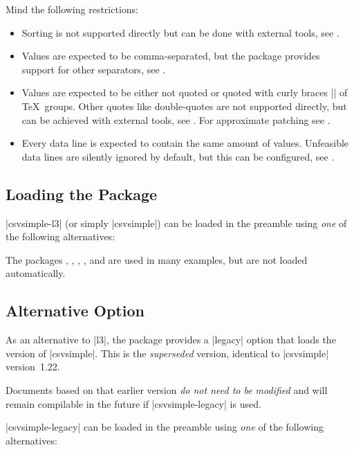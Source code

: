 \documentclass[a4paper,11pt]{ltxdoc}
\begin{document}
Mind the following restrictions:
\begin{itemize}
\item Sorting is not supported directly but can be done
  with external tools, see .
\item Values are expected to be comma-separated, but the package
  provides support for other separators, see .
\item Values are expected to be either not quoted or quoted with
  curly braces |{}| of \TeX\ groups. Other quotes like double-quotes
  are not supported directly, but can be achieved
  with external tools, see .
  For approximate patching see .
\item Every data line is expected to contain the same amount of values.
  Unfeasible data lines are silently ignored by default, but this can
  be configured, see .
\end{itemize}


\subsection{Loading the Package}
|csvsimple-l3| (or simply |csvsimple|) can be loaded in the preamble using
\emph{one} of the following alternatives:
\begin{dispListing}
\usepackage{csvsimple}
\usepackage[l3]{csvsimple}
\usepackage{csvsimple-l3}
\end{dispListing}

The packages , , ,
, and  are used in many examples, but are not
loaded automatically.

\subsection{Alternative Option}
As an alternative to |l3|, the package provides a |legacy| option that loads the
\LaTeXe{} version of |csvsimple|. This is the \emph{superseded} version,
identical to |csvsimple| version~1.22.

Documents based on that earlier version \emph{do not need to be modified} and
will remain compilable in the future if |csvsimple-legacy| is used.\par

|csvsimple-legacy| can be loaded in the preamble using \emph{one} of the following alternatives:
\begin{dispListing}
\usepackage[legacy]{csvsimple}
\usepackage{csvsimple-legacy}
\end{dispListing}
\end{document}
